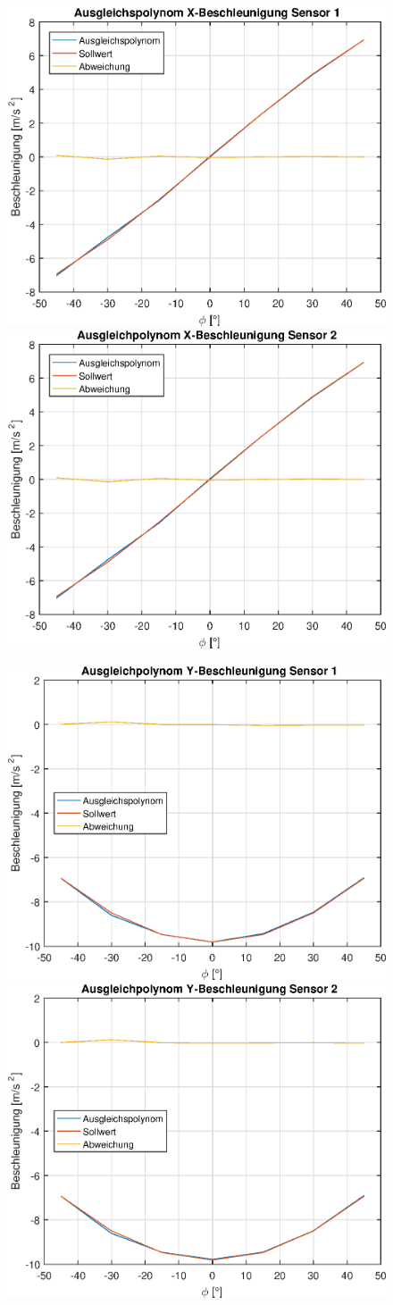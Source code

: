 \vspace*{-\baselineskip}
\begin{figure}[h]
	\includegraphics[width=0.5\linewidth]{img/X1__dd___fitted.eps}
	\includegraphics[width=0.5\linewidth]{img/X2__dd___fitted.eps}
\end{figure}

\vspace*{-\baselineskip}
\begin{figure}[h!]
	\includegraphics[width=0.5\linewidth]{img/Y1__dd___fitted.eps}
	\includegraphics[width=0.5\linewidth]{img/Y2__dd___fitted.eps}
\end{figure}

